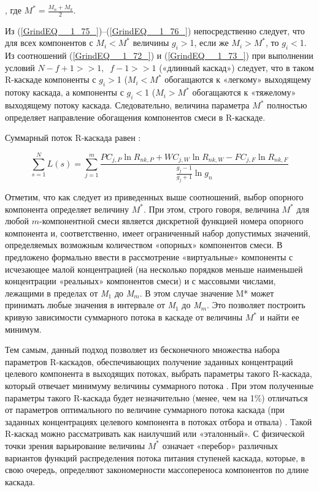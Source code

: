 , где $M^{*} =\frac{M_{n} +M_{k} }{2} $.

Из (\ref{GrindEQ__1_75_})--(\ref{GrindEQ__1_76_}) непосредственно следует, что для всех компонентов с $M_{i} $$\mathrm{<}$$M^{*} $ величины $g_{i} $$\mathrm{>}$1, если же $M_{i} $$\mathrm{>}$$M^{*} $, то $g_{i} $$\mathrm{<}$1. Из соотношений (\ref{GrindEQ__1_72_}) и (\ref{GrindEQ__1_73_}) при выполнении условий $N-f+1>>1,\; \; f-1>>1$ («длинный каскад») следует, что в таком R-каскаде компоненты с $g_{i} $$\mathrm{>}$1 ($M_{i} $$\mathrm{<}$$M^{*} $ обогащаются к «легкому» выходящему потоку каскада, а компоненты с $g_{i} $$\mathrm{<}$1 ($M_{i} $$\mathrm{>}$$M^{*}$ обогащаются к «тяжелому» выходящему потоку каскада. Следовательно, величина параметра $M^{*}$ полностью определяет направление обогащения компонентов смеси в R-каскаде. 

Суммарный поток R-каскада равен \cite{sulaberidzeTeoriyaKaskadovDlya2011}:

\begin{equation} \label{GrindEQ__1_77_} 
  \sum _{s=1}^{N}L(s) =\sum _{j=1}^{m}\frac{PC_{j,P} \ln R_{nk,P} +WC_{j,W} \ln R_{nk,W} -FC_{j,F} \ln R_{nk,F} }{\frac{g_{j} -1}{g_{j} +1} \ln g_{n} }              
\end{equation} 

Отметим, что как следует из приведенных выше соотношений, выбор опорного компонента определяет величину $M^{*}$. При этом, строго говоря, величина $M^{*}$ для любой $m$-компонентной смеси является дискретной функцией номера опорного компонента и, соответственно, имеет ограниченный набор допустимых значений, определяемых возможным количеством «опорных» компонентов смеси. В \cite{sulaberidzeSravnenieOptimalnyhModelnyh2008} предложено формально ввести в рассмотрение «виртуальные» компоненты с исчезающее малой концентрацией (на несколько порядков меньше наименьшей концентрации «реальных» компонентов смеси) и с массовыми числами, лежащими в пределах от \textit{M${}_{1}$} до \textit{M${}_{m}$}. В этом случае значение M* может принимать любые значения в интервале от \textit{M${}_{1}$} до \textit{M${}_{m}$}. Это позволяет построить кривую зависимости суммарного потока в каскаде от величины $M^{*}$ и найти ее минимум.

Тем самым, данный подход позволяет из бесконечного множества набора параметров R-каскадов, обеспечивающих получение заданных концентраций целевого компонента в выходящих потоках, выбрать параметры такого R-каскада, который отвечает минимуму величины суммарного потока \cite{sulaberidzeSravnenieOptimalnyhModelnyh2008}. При этом полученные параметры такого R-каскада будет незначительно (менее, чем на 1\%) отличаться от параметров оптимального по величине суммарного потока каскада (при заданных концентрациях целевого компонента в потоках отбора и отвала) \cite{songComparativeStudyModel2010}. Такой R-каскад можно рассматривать как наилучший или «эталонный». С физической точки зрения варьирование величины $M^{*}$ означает «перебор» различных вариантов функций распределения потока питания ступеней каскада, которые, в свою очередь, определяют закономерности массопереноса компонентов по длине каскада.


